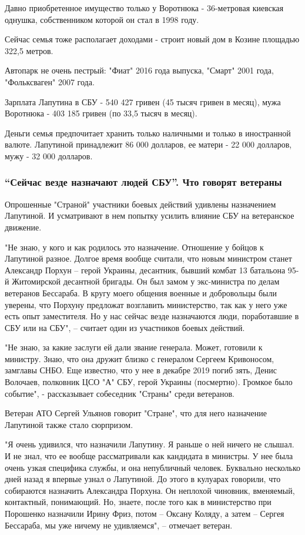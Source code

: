 Давно приобретенное имущество только у Воротнюка - 36-метровая киевская
однушка, собственником которой он стал в 1998 году. 

Сейчас семья тоже располагает доходами - строит новый дом в Козине площадью
322,5 метров. 

Автопарк не очень пестрый: "Фиат" 2016 года выпуска, "Смарт" 2001 года,
"Фольксваген" 2007 года. 

Зарплата Лапутина в СБУ - 540 427 гривен (45 тысяч гривен в месяц), мужа
Воротнюка - 403 185 гривен (по 33,5 тысяч в месяц). 

Деньги семья предпочитает хранить только наличными и только в иностранной
валюте. Лапутиной принадлежит 86 000 долларов, ее матери - 22 000 долларов,
мужу - 32 000 долларов. 

\subsubsection{\enquote{Сейчас везде назначают людей СБУ}. Что говорят ветераны }

Опрошенные "Страной" участники боевых действий удивлены назначением Лапутиной.
И усматривают в нем попытку усилить влияние СБУ на ветеранское движение. 

"Не знаю, у кого и как родилось это назначение. Отношение у бойцов к Лапутиной
разное. Долгое время вообще считали, что новым министром станет Александр
Порхун – герой Украины, десантник, бывший комбат 13 батальона 95-й Житомирской
десантной бригады. Он был замом у экс-министра по делам ветеранов Бессараба. В
кругу моего общения военные и добровольцы были уверены, что Порхуну предложат
возглавить министерство, так как у него уже есть опыт заместителя. Но у нас
сейчас везде назначаются люди, поработавшие в СБУ или на СБУ", – считает один
из участников боевых действий.

"Не знаю, за какие заслуги ей дали звание генерала. Может, готовили к министру.
Знаю, что она дружит близко с генералом Сергеем Кривоносом, замглавы СНБО. Еще
известно, что у нее в декабре 2019 погиб зять, Денис Волочаев, полковник ЦСО
"А" СБУ, герой Украины (посмертно). Громкое было событие", - рассказывает
собеседник "Страны" среди ветеранов.

Ветеран АТО Сергей Ульянов говорит "Стране", что для него назначение Лапутиной
также стало сюрпризом.

"Я очень удивился, что назначили Лапутину. Я раньше о ней ничего не слышал. И
не знал, что ее вообще рассматривали как кандидата в министры. У нее была очень
узкая специфика службы, и она непубличный человек. Буквально несколько дней
назад я впервые узнал о Лапутиной. До этого в кулуарах говорили, что собираются
назначить Александра Порхуна. Он неплохой чиновник, вменяемый, контактный,
понимающий. Но, знаете, после того как в министерство при Порошенко назначили
Ирину Фриз, потом – Оксану Коляду, а затем – Сергея Бессараба, мы уже ничему не
удивляемся", – отмечает ветеран.

